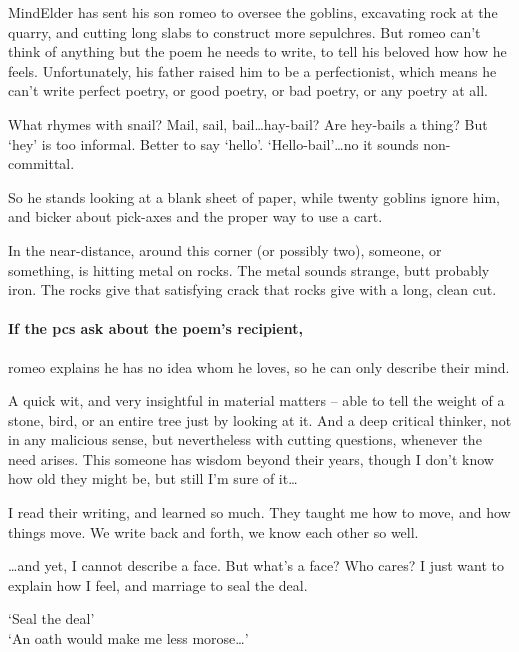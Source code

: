 \begin{multicols}{2}
\Gls{MindElder} has sent his son \gls{romeo} to oversee the goblins, excavating rock at the quarry, and cutting long slabs to construct more sepulchres.
But \gls{romeo} can't think of anything but the poem he needs to write, to tell his beloved how how he feels.
Unfortunately, his father raised him to be a perfectionist, which means he can't write perfect poetry, or good poetry, or bad poetry, or any poetry at all.

\begin{speechtext}
  What rhymes with snail?
  Mail, sail, bail\ldots hay-bail?
  Are hey-bails a thing?
  But `hey' is too informal.
  Better to say `hello'.
  `Hello-bail'\ldots no it sounds non-committal.
\end{speechtext}

So he stands looking at a blank sheet of paper, while twenty goblins ignore him, and bicker about pick-axes and the proper way to use a cart.

\begin{boxtext}
  In the near-distance, around this corner (or possibly two), someone, or something, is hitting metal on rocks.
  The metal sounds strange, butt probably iron.
  The rocks give that satisfying crack that rocks give with a long, clean cut.
\end{boxtext}

\paragraph{If the \glspl{pc} ask about the poem's recipient,}
\gls{romeo} explains he has no idea whom he loves, so he can only describe their mind.

\begin{speechtext}
  A quick wit, and very insightful in material matters -- able to tell the weight of a stone, bird, or an entire tree just by looking at it.
  And a deep critical thinker, not in any malicious sense, but nevertheless with cutting questions, whenever the need arises.
  This someone has wisdom beyond their years, though I don't know how old they might be, but still I'm sure of it\ldots

  I read their writing, and learned so much.
  They taught me how to move, and how things move.
  We write back and forth, we know each other so well.

  \ldots and yet, I cannot describe a face.
  But what's a face?
  Who cares?
  I just want to explain how I feel, and marriage to seal the deal.

  `Seal the deal'\\
  `An oath would make me less morose\ldots'


\end{speechtext}
\end{multicols}
